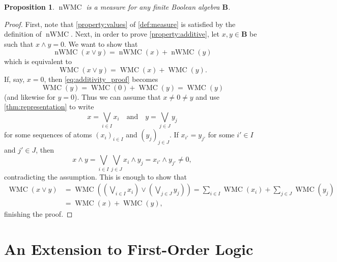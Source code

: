 \documentclass{article}
\newtheorem{proposition}{Proposition}
\theoremstyle{definition}
\theoremstyle{remark}
\DeclareMathOperator{\WMC}{WMC}
\DeclareMathOperator{\nWMC}{nWMC}
\begin{document}
\begin{proposition}
  $\nWMC$ is a measure for any finite Boolean algebra $\mathbf{B}$.
\end{proposition}
\begin{proof}
  First, note that \cref{property:values} of \cref{def:measure} is satisfied by
  the definition of $\nWMC$. Next, in order to prove \cref{property:additive},
  let $x, y \in \mathbf{B}$ be such that $x \land y = 0$. We want to show that
  \[
    \nWMC(x \lor y) = \nWMC(x) + \nWMC(y)
  \]
  which is equivalent to
  \begin{equation} \label{eq:additivity_proof}
    \WMC(x \lor y) = \WMC(x) + \WMC(y).
  \end{equation}
  If, say, $x = 0$, then \cref{eq:additivity_proof} becomes
  \[
    \WMC(y) = \WMC(0) + \WMC(y) = \WMC(y)
  \]
  (and likewise for $y = 0$). Thus we can assume that $x \ne 0 \ne y$ and use
  \cref{thm:representation} to write
  \[
    x = \bigvee_{i \in I} x_i \quad \text{and} \quad y = \bigvee_{j \in J} y_j
  \]
  for some sequences of atoms $(x_i)_{i \in I}$ and $(y_j)_{j \in J}$. If
  $x_{i'} = y_{j'}$ for some $i' \in I$ and $j' \in J$, then
  \[
    x \land y = \bigvee_{i \in I} \bigvee_{j \in J} x_i \land y_j = x_{i'} \land
    y_{j'} \ne 0,
  \]
  contradicting the assumption. This is enough to show that
  \begin{align*}
    \WMC(x \lor y) &= \WMC\left( \left( \bigvee_{i \in I} x_i \right) \lor \left(\bigvee_{j \in J} y_j \right) \right) = \sum_{i \in I} \WMC(x_i) + \sum_{j \in J} \WMC(y_j) \\
                   &= \WMC(x) + \WMC(y),
  \end{align*}
  finishing the proof.
\end{proof}


\section{An Extension to First-Order Logic}
\end{document}
